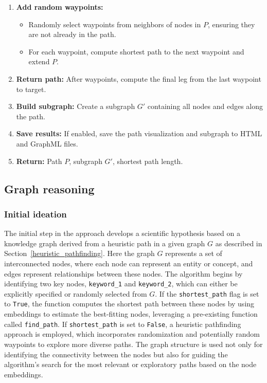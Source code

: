 \documentclass{article}
\begin{document}
\begin{tcolorbox}[colback=blue!5!white, colframe=blue!75!black, title=Heuristic Pathfinding with Randomization and Waypoints]
\begin{enumerate}
\begin{enumerate}
\begin{itemize}
\begin{itemize}
            \end{itemize}
        \end{itemize}
        \end{enumerate}
    \item \textbf{Add random waypoints:} 
    \begin{itemize}
        \item Randomly select waypoints from neighbors of nodes in $P$, ensuring they are not already in the path.
        \item For each waypoint, compute shortest path to the next waypoint and extend $P$.
    \end{itemize}
    \item \textbf{Return path:} After waypoints, compute the final leg from the last waypoint to target.
    \item \textbf{Build subgraph:} Create a subgraph $G'$ containing all nodes and edges along the path.
    \item \textbf{Save results:} If enabled, save the path visualization and subgraph to HTML and GraphML files.
    \item \textbf{Return:} Path $P$, subgraph $G'$, shortest path length.
\end{enumerate}
\end{tcolorbox}


\subsection{Graph reasoning}\label{sec:graph_reasoning}

\subsubsection{Initial ideation}
\label{initial_ideation}
The initial step in the approach develops a scientific hypothesis based on a knowledge graph derived from a heuristic path in a given graph $G$ as described in Section~\ref{heuristic_pathfinding}. Here the graph $G$ represents a set of interconnected nodes, where each node can represent an entity or concept, and edges represent relationships between these nodes. The algorithm begins by identifying two key nodes, \texttt{keyword\_1} and \texttt{keyword\_2}, which can either be explicitly specified or randomly selected from $G$. If the \texttt{shortest\_path} flag is set to \texttt{True}, the function computes the shortest path between these nodes by using embeddings to estimate the best-fitting nodes, leveraging a pre-existing function called \texttt{find\_path}. If \texttt{shortest\_path} is set to \texttt{False}, a heuristic pathfinding approach is employed, which incorporates randomization and potentially random waypoints to explore more diverse paths. The graph structure is used not only for identifying the connectivity between the nodes but also for guiding the algorithm’s search for the most relevant or exploratory paths based on the node embeddings.
\end{document}
